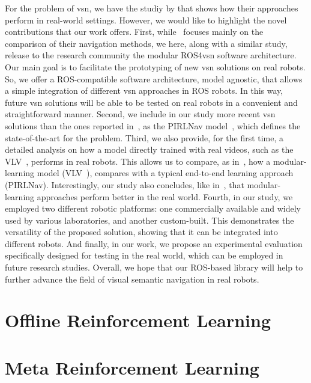 For the problem of \acrshort{vsn}, we have the studiy by \cite{gervet2022} that shows how their approaches perform in real-world settings.
However, we would like to highlight the novel contributions that our work offers.
First, while~\cite{gervet2022} focuses mainly on the comparison of their navigation methods, we here, along with a similar study, release to the research community the modular ROS4\acrshort{vsn} software architecture.
Our main goal is to facilitate the prototyping of new \acrshort{vsn} solutions on real robots.
So, we offer a ROS-compatible software architecture, model agnostic, that allows a simple integration of different \acrshort{vsn} approaches in ROS robots.
In this way, future \acrshort{vsn} solutions will be able to be tested on real robots in a convenient and straightforward manner.
Second, we include in our study more recent \acrshort{vsn} solutions than the ones reported in~\cite{gervet2022}, as the PIRLNav model~\cite{ramrakhya2023}, which defines the state-of-the-art for the \objnav problem.
Third, we also provide, for the first time, a detailed analysis on how a model directly trained with real videos, such as the VLV~\cite{chang2020}, performs in real robots.
This allows us to compare, as in~\cite{gervet2022}, how a modular-learning model (\ie VLV~\cite{chang2020}), compares with a typical end-to-end learning approach (\ie PIRLNav).
Interestingly, our study also concludes, like in~\cite{gervet2022}, that modular-learning approaches perform better in the real world.
Fourth, in our study, we employed two different robotic platforms: one commercially available and widely used by various laboratories, and another custom-built.
This demonstrates the versatility of the proposed solution, showing that it can be integrated into different robots.
And finally, in our work, we propose an experimental evaluation specifically designed for testing in the real world, which can be employed in future research studies.
Overall, we hope that our ROS-based library will help to further advance the field of visual semantic navigation in real robots.

\section{Offline Reinforcement Learning}\label{sec:offline-reinforcement-learning}

\section{Meta Reinforcement Learning}\label{sec:meta-reinforcement-learning}